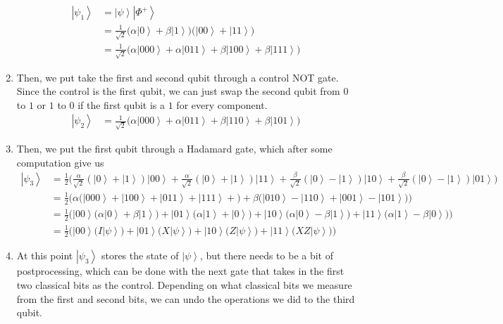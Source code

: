 \documentclass{article}
\newcommand{\ket}[1]{\ensuremath{\left|#1\right\rangle}}
\begin{document}
\begin{theorem}
\begin{enumerate}
\begin{align}
            \ket{\psi_1} & = \ket{\psi} \ket{\Phi^+} \\
                         & = \frac{1}{\sqrt{2}} \big( \alpha \ket{0} + \beta \ket{1} \big) \big( \ket{00} + \ket{11} \big) \\
                         & = \frac{1}{\sqrt{2}} \big( \alpha \ket{000} + \alpha \ket{011} + \beta \ket{100} + \beta \ket{111} \big)
          \end{align}
        \item Then, we put take the first and second qubit through a control NOT gate. Since the control is the first qubit, we can just swap the second qubit from $0$ to $1$ or $1$ to $0$ if the first qubit is a $1$ for every component. 
          \begin{align} 
            \ket{\psi_2} & = \frac{1}{\sqrt{2}} \big( \alpha \ket{000} + \alpha \ket{011} + \beta \ket{110} + \beta \ket{101} \big)
          \end{align}
        \item Then, we put the first qubit through a Hadamard gate, which after some computation give us 
          \begin{align*} 
            \ket{\psi_3} & = \frac{1}{2} \bigg( \frac{\alpha}{\sqrt{2}} (\ket{0} + \ket{1}) \ket{00} + \frac{\alpha}{\sqrt{2}} (\ket{0} + \ket{1}) \ket{11}  + \frac{\beta}{\sqrt{2}} (\ket{0} - \ket{1} ) \ket{10} + \frac{\beta}{\sqrt{2}} ( \ket{0} - \ket{1}) \ket{01} \bigg) \\
                         & = \frac{1}{2} \bigg( \alpha \big( \ket{000} + \ket{100} + \ket{011} + \ket{111} + \big) + \beta \big( \ket{010} - \ket{110} + \ket{001} - \ket{101} \big)\bigg) \\
                         & = \frac{1}{2} \bigg( \ket{00} \big( \alpha \ket{0} + \beta \ket{1} \big) + \ket{01} \big( \alpha \ket{1} + \ket{0} \big) + \ket{10} \big( \alpha \ket{0} - \beta \ket{1} \big) + \ket{11} \big( \alpha \ket{1} - \beta \ket{0} \big) \bigg) \\
                         & = \frac{1}{2} \bigg( \ket{00} \big( I \ket{\psi}\big) + \ket{01} \big( X \ket{\psi} \big)  + \ket{10} \big(Z \ket{\psi}\big) + \ket{11} \big( X Z \ket{\psi} \big) \bigg)
          \end{align*}
        \item At this point $\ket{\psi_3}$ stores the state of $\ket{\psi}$, but there needs to be a bit of postprocessing, which can be done with the next gate that takes in the first two classical bits as the control. Depending on what classical bits we measure from the first and second bits, we can undo the operations we did to the third qubit. 

\end{enumerate}
\end{theorem}
\end{document}

